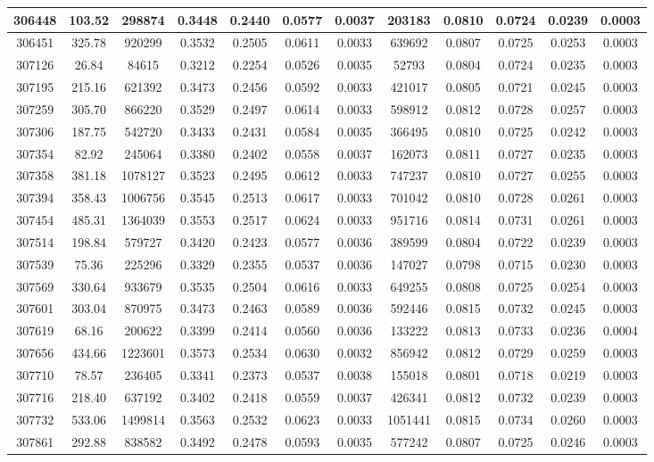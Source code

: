 \documentclass[10pt]{extarticle}
\begin{document}
\begin{longtable}{|c|c|c|c|c|c|c|c|c|c|c|c|}
\hline 
306448&103.52&298874&0.3448&0.2440&0.0577&0.0037&203183&0.0810&0.0724&0.0239&0.0003 \\ 
\hline 
306451&325.78&920299&0.3532&0.2505&0.0611&0.0033&639692&0.0807&0.0725&0.0253&0.0003 \\ 
\hline 
307126&26.84&84615&0.3212&0.2254&0.0526&0.0035&52793&0.0804&0.0724&0.0235&0.0003 \\ 
\hline 
307195&215.16&621392&0.3473&0.2456&0.0592&0.0033&421017&0.0805&0.0721&0.0245&0.0003 \\ 
\hline 
307259&305.70&866220&0.3529&0.2497&0.0614&0.0033&598912&0.0812&0.0728&0.0257&0.0003 \\ 
\hline 
307306&187.75&542720&0.3433&0.2431&0.0584&0.0035&366495&0.0810&0.0725&0.0242&0.0003 \\ 
\hline 
307354&82.92&245064&0.3380&0.2402&0.0558&0.0037&162073&0.0811&0.0727&0.0235&0.0003 \\ 
\hline 
307358&381.18&1078127&0.3523&0.2495&0.0612&0.0033&747237&0.0810&0.0727&0.0255&0.0003 \\ 
\hline 
307394&358.43&1006756&0.3545&0.2513&0.0617&0.0033&701042&0.0810&0.0728&0.0261&0.0003 \\ 
\hline 
307454&485.31&1364039&0.3553&0.2517&0.0624&0.0033&951716&0.0814&0.0731&0.0261&0.0003 \\ 
\hline 
307514&198.84&579727&0.3420&0.2423&0.0577&0.0036&389599&0.0804&0.0722&0.0239&0.0003 \\ 
\hline 
307539&75.36&225296&0.3329&0.2355&0.0537&0.0036&147027&0.0798&0.0715&0.0230&0.0003 \\ 
\hline 
307569&330.64&933679&0.3535&0.2504&0.0616&0.0033&649255&0.0808&0.0725&0.0254&0.0003 \\ 
\hline 
307601&303.04&870975&0.3473&0.2463&0.0589&0.0036&592446&0.0815&0.0732&0.0245&0.0003 \\ 
\hline 
307619&68.16&200622&0.3399&0.2414&0.0560&0.0036&133222&0.0813&0.0733&0.0236&0.0004 \\ 
\hline 
307656&434.66&1223601&0.3573&0.2534&0.0630&0.0032&856942&0.0812&0.0729&0.0259&0.0003 \\ 
\hline 
307710&78.57&236405&0.3341&0.2373&0.0537&0.0038&155018&0.0801&0.0718&0.0219&0.0003 \\ 
\hline 
307716&218.40&637192&0.3402&0.2418&0.0559&0.0037&426341&0.0812&0.0732&0.0239&0.0003 \\ 
\hline 
307732&533.06&1499814&0.3563&0.2532&0.0623&0.0033&1051441&0.0815&0.0734&0.0260&0.0003 \\ 
\hline 
307861&292.88&838582&0.3492&0.2478&0.0593&0.0035&577242&0.0807&0.0725&0.0246&0.0003 \\ 

\end{longtable}
\end{document}
